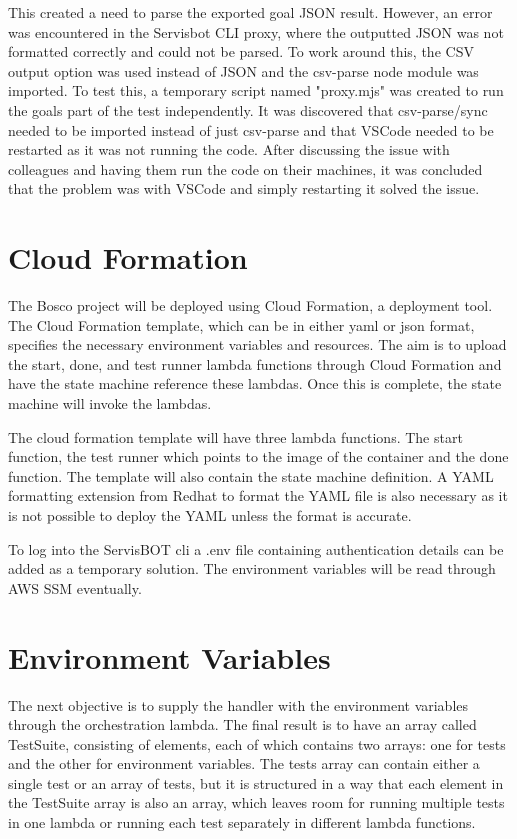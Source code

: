 \documentclass[12pt,a4paper,titlepage]{report}
\begin{document}
This created a need to parse the exported goal JSON result. However, an error was encountered in the Servisbot CLI proxy, where the outputted JSON was not formatted correctly and could not be parsed. To work around this, the CSV output option was used instead of JSON and the csv-parse node module was imported.
To test this, a temporary script named "proxy.mjs" was created to run the goals part of the test independently. It was discovered that csv-parse/sync needed to be imported instead of just csv-parse and that VSCode needed to be restarted as it was not running the code. After discussing the issue with colleagues and having them run the code on their machines, it was concluded that the problem was with VSCode and simply restarting it solved the issue.

\section{Cloud Formation}
The Bosco project will be deployed using Cloud Formation, a deployment tool.
The Cloud Formation template, which can be in either yaml or json format, specifies the necessary environment variables and resources.
The aim is to upload the start, done, and test runner lambda functions through Cloud Formation and have the state machine reference these lambdas.
Once this is complete, the state machine will invoke the lambdas.

The cloud formation template will have three lambda functions.
The start function, the test runner which points to the image of the container and the done function. The
template will also contain the state machine definition. A YAML formatting extension from Redhat to format the YAML
file is also necessary as it is not possible to deploy the YAML unless the format is accurate.

To log into the ServisBOT cli a .env file containing authentication details can be added as a temporary solution.
The environment variables will be read through AWS SSM eventually.

\section{Environment Variables}
The next objective is to supply the handler with the environment variables through the orchestration lambda.
The final result is to have an array called TestSuite, consisting of elements, each of which contains two arrays: one for tests and the other for environment variables.
The tests array can contain either a single test or an array of tests, but it is structured in a way that each element in the TestSuite array is also an array,
which leaves room for running multiple tests in one lambda or running each test separately in different lambda functions.
\end{document}

